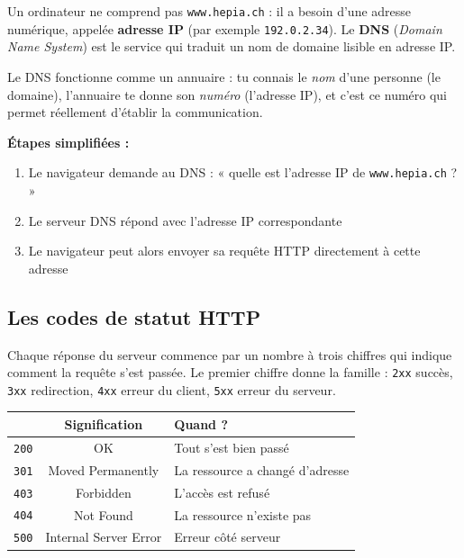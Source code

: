 \documentclass[a4paper,11pt]{article}
\newcommand{\hdr}[1]{\multicolumn{1}{l}{\color{white}\bfseries #1}}
\newcommand{\hdrc}[1]{\multicolumn{1}{c}{\color{white}\bfseries #1}}
\renewcommand{\arraystretch}{1.3}
\begin{document}
Un ordinateur ne comprend pas \texttt{www.hepia.ch} : il a besoin d'une adresse numérique, appelée \textbf{adresse IP} (par exemple \texttt{192.0.2.34}). Le \textbf{DNS} (\textit{Domain Name System}) est le service qui traduit un nom de domaine lisible en adresse IP.

\begin{tcolorbox}[astuce, title={Analogie --- L'annuaire téléphonique}]
Le DNS fonctionne comme un annuaire : tu connais le \textit{nom} d'une personne (le domaine), l'annuaire te donne son \textit{numéro} (l'adresse IP), et c'est ce numéro qui permet réellement d'établir la communication.
\end{tcolorbox}

\vspace{2pt}
\noindent\textbf{Étapes simplifiées :}
\begin{enumerate}
  \item Le navigateur demande au DNS : « quelle est l'adresse IP de \texttt{www.hepia.ch} ? »
  \item Le serveur DNS répond avec l'adresse IP correspondante
  \item Le navigateur peut alors envoyer sa requête HTTP directement à cette adresse
\end{enumerate}

\subsection{Les codes de statut HTTP}

Chaque réponse du serveur commence par un nombre à trois chiffres qui indique comment la requête s'est passée. Le premier chiffre donne la famille : \texttt{2xx} succès, \texttt{3xx} redirection, \texttt{4xx} erreur du client, \texttt{5xx} erreur du serveur.

\begin{center}
\renewcommand{\arraystretch}{1.0}
\begin{tabularx}{0.9\linewidth}{ccX}
  \toprule
  \rowcolor{uniNavy}
  \hdrc{Code} &  \hdrc{Signification} &  \hdr{Quand ?} \\
  \midrule
  \rowcolor{uniPaper}
  \texttt{200} & OK & Tout s'est bien passé \\
  \texttt{301} & Moved Permanently & La ressource a changé d'adresse \\
  \rowcolor{uniPaper}
  \texttt{403} & Forbidden & L'accès est refusé \\
  \texttt{404} & Not Found & La ressource n'existe pas \\
  \rowcolor{uniPaper}
  \texttt{500} & Internal Server Error & Erreur côté serveur \\
  \bottomrule
\end{tabularx}
\end{center}
\end{document}
